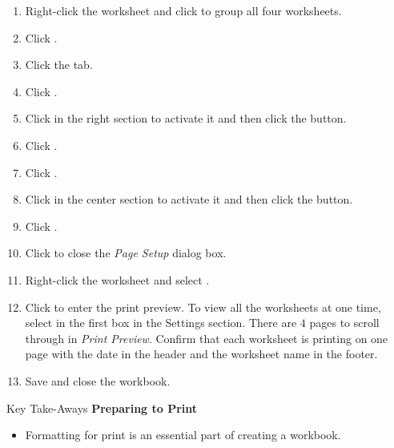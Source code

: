 \begin{enumerate}[resume]
	\item Right-click the  worksheet and click  to group all four worksheets. 
	\item Click .
	\item Click the  tab.
	\item Click .
	\item Click in the right section to activate it and then click the  button.
	\item Click .
	\item Click .
	\item Click in the center section to activate it and then click the  button.
	\item Click .
	\item Click  to close the \textit{Page Setup} dialog box.
	\item Right-click the  worksheet and select .
	\item Click  to enter the print preview. To view all the worksheets at one time, select  in the first box in the Settings section. There are $ 4 $ pages to scroll through in \textit{Print Preview}. Confirm that each worksheet is printing on one page with the date in the header and the worksheet name in the footer.
	\item Save and close the  workbook.
\end{enumerate}

\begin{center}
	\begin{tkwbox}{Key Take-Aways}
		\textbf{Preparing to Print}
		\\
		\begin{itemize}
			\setlength{\itemsep}{0pt}
			\setlength{\parskip}{0pt}
			\setlength{\parsep}{0pt}
			
			\item Formatting for print is an essential part of creating a workbook.
			
		\end{itemize}
	\end{tkwbox}
\end{center}

